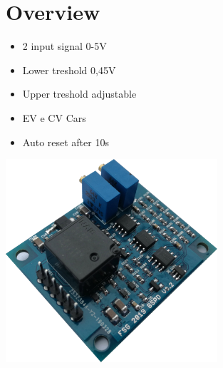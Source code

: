 \documentclass[a4paper,12pt,oneside,pdflatex,italian,final,twocolumn]{article}
\begin{document}
\begin{figure}
\begin{minipage}{0.47\textwidth}

\section{Overview}
    \begin{itemize}
        \item 2 input signal 0-5V
        \item Lower treshold 0,45V
        \item Upper treshold adjustable
        \item EV e CV Cars
        \item Auto reset after 10s
    \end{itemize}


\end{minipage}
\hfill
\begin{minipage}{0.47\textwidth}
\centering
\includegraphics[width=0.7\textwidth,right]{bspd_fsg2019.jpg}

\end{minipage}
\end{figure}
\end{document}
